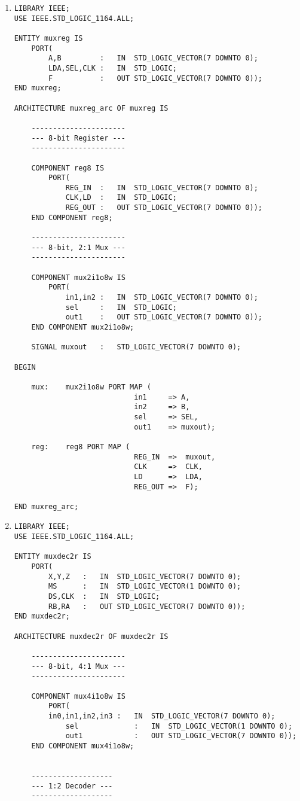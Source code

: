 \begin{enumerate}
	\item \begin{lstlisting}
LIBRARY IEEE;
USE IEEE.STD_LOGIC_1164.ALL;

ENTITY muxreg IS
	PORT(
		A,B			:	IN	STD_LOGIC_VECTOR(7 DOWNTO 0);
		LDA,SEL,CLK	:	IN	STD_LOGIC;
		F			:	OUT	STD_LOGIC_VECTOR(7 DOWNTO 0));
END muxreg;

ARCHITECTURE muxreg_arc OF muxreg IS

	----------------------
	--- 8-bit Register ---
	----------------------

	COMPONENT reg8 IS
		PORT(
			REG_IN	:	IN	STD_LOGIC_VECTOR(7 DOWNTO 0);
			CLK,LD	:	IN	STD_LOGIC;
			REG_OUT	:	OUT	STD_LOGIC_VECTOR(7 DOWNTO 0));
	END COMPONENT reg8;

	----------------------
	--- 8-bit, 2:1 Mux ---
	----------------------

	COMPONENT mux2i1o8w IS
		PORT(
			in1,in2	:	IN	STD_LOGIC_VECTOR(7 DOWNTO 0);
			sel		:	IN	STD_LOGIC;
			out1	:	OUT	STD_LOGIC_VECTOR(7 DOWNTO 0));
	END COMPONENT mux2i1o8w;

	SIGNAL muxout	:	STD_LOGIC_VECTOR(7 DOWNTO 0);

BEGIN

	mux:	mux2i1o8w PORT MAP (
							in1		=> A,
							in2		=> B,
							sel		=> SEL,
							out1	=> muxout);

	reg:	reg8 PORT MAP (
							REG_IN	=>	muxout,
							CLK		=>	CLK,
							LD		=>	LDA,
							REG_OUT	=>	F);

END muxreg_arc;
	\end{lstlisting}

	\item \begin{lstlisting}
LIBRARY IEEE;
USE IEEE.STD_LOGIC_1164.ALL;

ENTITY muxdec2r IS
	PORT(
		X,Y,Z	:	IN	STD_LOGIC_VECTOR(7 DOWNTO 0);
		MS		:	IN	STD_LOGIC_VECTOR(1 DOWNTO 0);
		DS,CLK	:	IN	STD_LOGIC;
		RB,RA	:	OUT	STD_LOGIC_VECTOR(7 DOWNTO 0));
END muxdec2r;

ARCHITECTURE muxdec2r OF muxdec2r IS

	----------------------
	--- 8-bit, 4:1 Mux ---
	----------------------

	COMPONENT mux4i1o8w IS
		PORT(
		in0,in1,in2,in3	:	IN	STD_LOGIC_VECTOR(7 DOWNTO 0);
			sel				:	IN	STD_LOGIC_VECTOR(1 DOWNTO 0);
			out1			:	OUT	STD_LOGIC_VECTOR(7 DOWNTO 0));
	END COMPONENT mux4i1o8w;


	-------------------
	--- 1:2 Decoder ---
	-------------------


\end{lstlisting}
\end{enumerate}
